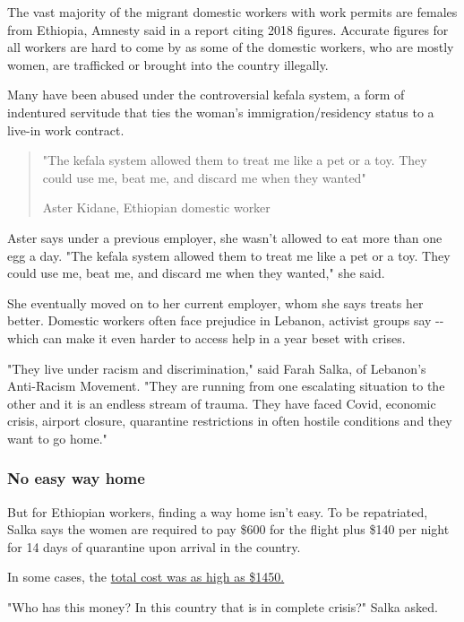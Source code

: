 The vast majority of the migrant domestic workers with work permits are
females from Ethiopia, Amnesty said in a report citing 2018 figures.
Accurate figures for all workers are hard to come by as some of the
domestic workers, who are mostly women, are trafficked or brought into
the country illegally.

Many have been abused under the controversial kefala system, a form of
indentured servitude that ties the woman's immigration/residency status
to a live-in work contract.

\begin{quote}
"The kefala system allowed them to treat me like a pet or a toy. They
could use me, beat me, and discard me when they wanted"

Aster Kidane, Ethiopian domestic worker
\end{quote}

Aster says under a previous employer, she wasn't allowed to eat more
than one egg a day. "The kefala system allowed them to treat me like a
pet or a toy. They could use me, beat me, and discard me when they
wanted," she said.

She eventually moved on to her current employer, whom she says treats
her better. Domestic workers often face prejudice in Lebanon, activist
groups say -\/- which can make it even harder to access help in a year
beset with crises.

"They live under racism and discrimination," said Farah Salka, of
Lebanon's Anti-Racism Movement. "They are running from one escalating
situation to the other and it is an endless stream of trauma. They have
faced Covid, economic crisis, airport closure, quarantine restrictions
in often hostile conditions and they want to go home."

\hypertarget{no-easy-way-home}{%
\subsubsection{No easy way home}\label{no-easy-way-home}}

But for Ethiopian workers, finding a way home isn't easy. To be
repatriated, Salka says the women are required to pay \$600 for the
flight plus \$140 per night for 14 days of quarantine upon arrival in
the country.

In some cases, the
\href{https://www.middleeasteye.net/news/ethiopia-lebanon-domestic-workers-pay-quarantine}{total
cost was as high as \$1450.}

"Who has this money? In this country that is in complete crisis?" Salka
asked.

